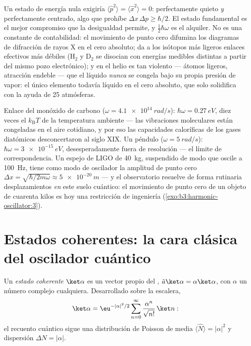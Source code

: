 \begin{remark}\label{rem:b3:harmonic-oscillator:zeropoint}
Un estado de energía nula exigiría $\langle\hat p^2\rangle =
\langle\hat x^2\rangle = 0$: perfectamente quieto \emph{y} perfectamente
centrado, algo que prohíbe $\Delta x\,\Delta p \ge \hbar/2$. El estado
fundamental es el mejor compromiso que la desigualdad permite, y
$\tfrac12\hbar\omega$ es el alquiler. No es una constante de contabilidad:
el movimiento de punto cero difumina los diagramas de difracción de rayos X
en el cero absoluto; da a los isótopos más ligeros enlaces efectivos más
débiles (H$_2$ y D$_2$ se disocian con energías medibles distintas a partir
del mismo pozo electrónico); y en el helio es tan violento --- átomos
ligeros, atracción endeble --- que el líquido \emph{nunca} se congela bajo
su propia presión de vapor: el único elemento todavía líquido en el cero
absoluto, que solo solidifica con la ayuda de 25 atmósferas.
\end{remark}

\begin{example}\label{ex:b3:harmonic-oscillator:scales}
Enlace del monóxido de carbono ($\omega = \qty{4.1e14}{rad/s}$): $\hbar\omega =
\qty{0.27}{eV}$, diez veces el $k_{\text{B}}T$ de la temperatura ambiente
--- las vibraciones moleculares están congeladas en el aire cotidiano, y por
eso las capacidades caloríficas de los gases diatómicos desconcertaron al
siglo XIX. Un péndulo ($\omega = \qty{5}{rad/s}$): $\hbar\omega = \qty{3e-15}{eV}$,
desesperadamente fuera de resolución --- el límite de correspondencia. Un
espejo de LIGO de \qty{40}{kg}, suspendido de modo que oscile a
\qty{100}{Hz}, tiene como modo de oscilador la amplitud de punto cero $\Delta x =
\sqrt{\hbar/2m\omega} \approx \qty{5e-20}{m}$ --- y el observatorio resuelve
de forma rutinaria desplazamientos \emph{en} este suelo cuántico: el
movimiento de punto cero de un objeto de cuarenta kilos es hoy una
restricción de ingeniería (\cref{exo:b3:harmonic-oscillator:3}).
\end{example}

\section{Estados coherentes: la cara clásica del oscilador cuántico}

\begin{definition}\label{def:b3:harmonic-oscillator:coherent}
Un \emph{estado coherente} $\ket\alpha$ es un vector propio del , $\hat a\ket\alpha = \alpha\ket\alpha$, con
$\alpha$ un número complejo cualquiera. Desarrollado sobre la escalera,
\[
\ket\alpha = \eu^{-|\alpha|^2/2}\sum_{n=0}^\infty
\frac{\alpha^n}{\sqrt{n!}}\,\ket n :
\]
el recuento cuántico sigue una distribución de Poisson de media $\langle\hat
N\rangle = |\alpha|^2$ y dispersión $\Delta N = |\alpha|$.
\end{definition}


